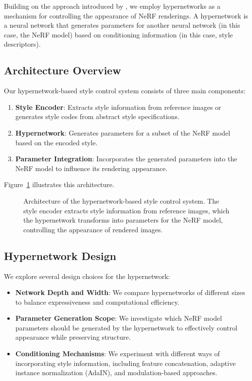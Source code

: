 Building on the approach introduced by \textcite{fehrentz2024intraoperative}, we employ hypernetworks as a mechanism for controlling the appearance of NeRF renderings. A hypernetwork is a neural network that generates parameters for another neural network (in this case, the NeRF model) based on conditioning information (in this case, style descriptors).

\subsection{Architecture Overview}

Our hypernetwork-based style control system consists of three main components:

\begin{enumerate}
    \item \textbf{Style Encoder}: Extracts style information from reference images or generates style codes from abstract style specifications.
    
    \item \textbf{Hypernetwork}: Generates parameters for a subset of the NeRF model based on the encoded style.
    
    \item \textbf{Parameter Integration}: Incorporates the generated parameters into the NeRF model to influence its rendering appearance.
\end{enumerate}

Figure~\ref{fig:hypernetwork} illustrates this architecture.

\begin{figure}[htpb]
  \centering
  \caption{Architecture of the hypernetwork-based style control system. The style encoder extracts style information from reference images, which the hypernetwork transforms into parameters for the NeRF model, controlling the appearance of rendered images.}
  \label{fig:hypernetwork}
\end{figure}

\subsection{Hypernetwork Design}

We explore several design choices for the hypernetwork:

\begin{itemize}
    \item \textbf{Network Depth and Width}: We compare hypernetworks of different sizes to balance expressiveness and computational efficiency.
    
    \item \textbf{Parameter Generation Scope}: We investigate which NeRF model parameters should be generated by the hypernetwork to effectively control appearance while preserving structure.
    
    \item \textbf{Conditioning Mechanisms}: We experiment with different ways of incorporating style information, including feature concatenation, adaptive instance normalization (AdaIN), and modulation-based approaches.
\end{itemize}

